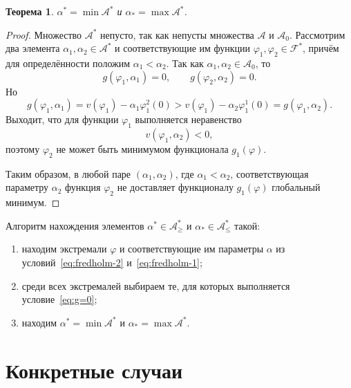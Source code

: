\documentclass[a4paper,14pt]{article}
\newtheorem{theorem}{Теорема}
\theoremstyle{definition}
\begin{document}
\begin{theorem}
  $\alpha^* = \min \mathcal{A}^*$ и $\alpha_* = \max \mathcal{A}^*$.
\end{theorem}

\begin{proof}
  Множество $\mathcal{A}^*$ непусто, так как непусты множества $\mathcal{A}$
  и $\mathcal{A}_0$. Рассмотрим два элемента $\alpha_1, \alpha_2 \in \mathcal{A}^*$ и
  соответствующие им функции $\varphi_1, \varphi_2 \in \mathcal{F}^*$, причём для
  определённости положим $\alpha_1 < \alpha_2$. Так как
  $\alpha_1, \alpha_2 \in \mathcal{A}_0$, то
  \begin{equation*}
    g(\varphi_1, \alpha_1) = 0, \qquad g(\varphi_2, \alpha_2) = 0.
  \end{equation*}
  Но
  \begin{equation*}
    g(\varphi_1, \alpha_1) = v(\varphi_1) - \alpha_1 \varphi_1^2(0)
    > v(\varphi_1) - \alpha_2 \varphi_1^1(0) = g(\varphi_1, \alpha_2).
  \end{equation*}
  Выходит, что для функции $\varphi_1$ выполняется неравенство
  \begin{equation*}
    v(\varphi_1, \alpha_2) < 0,
  \end{equation*}
  поэтому $\varphi_2$ не может быть минимумом функционала $g_1(\varphi)$.

  Таким образом, в любой паре $(\alpha_1, \alpha_2)$, где $\alpha_1 < \alpha_2$,
  соответствующая параметру $\alpha_2$ функция $\varphi_2$ не доставляет функционалу
  $g_1(\varphi)$ глобальный минимум.
\end{proof}

Алгоритм нахождения элементов $\alpha^* \in \mathcal{A}_\geqslant^*$ и
$\alpha_* \in \mathcal{A}_\leqslant^*$ такой:
\begin{enumerate}
  \item находим экстремали $\varphi$ и соответствующие им параметры $\alpha$ из
        условий~\eqref{eq:fredholm-2} и~\eqref{eq:fredholm-1};
  \item среди всех экстремалей выбираем те, для которых выполняется условие~\eqref{eq:g=0};
  \item находим $\alpha^* = \min \mathcal{A}^*$ и $\alpha_* = \max \mathcal{A}^*$.
\end{enumerate}

\newpage
\section{Конкретные случаи}
\end{document}

